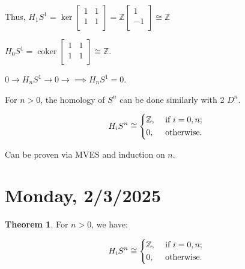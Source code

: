 \documentclass{article}
\theoremstyle{definition}
\newtheorem{theorem}{Theorem}
\begin{document}
    Thus, \(H_1 S^1 = \ker \begin{bmatrix}
        1 & 1 \\
        1 & 1 \\
    \end{bmatrix} = \mathbb{Z} \begin{bmatrix}
        1 \\
        -1 \\
    \end{bmatrix} \cong \mathbb{Z}\) 

    \(H_0 S^1 = \operatorname{coker} \begin{bmatrix}
        1 & 1 \\
        1 & 1 \\
    \end{bmatrix} \cong \mathbb{Z}\).
    
    \(0 \to H_n S^1 \to 0 \to  \implies H_n S^1 = 0\).

    For \(n > 0\), the homology of \(S^n\) can be done similarly with 2 \(D^n\).

    \[
        H_i S^n \cong \begin{dcases}
            \mathbb{Z}, &\text{ if } i=0,n ;\\
            0, &\text{ otherwise} .
        \end{dcases}
    \]

    Can be proven via MVES and induction on \(n\).

    \section*{Monday, 2/3/2025}
    
    \begin{theorem}
        For \(n > 0\), we have:

        \[
            H_i S^n \cong \begin{dcases}
                \mathbb{Z}, &\text{ if } i = 0,n ;\\
                0, &\text{ otherwise} .
            \end{dcases}
        \]
    \end{theorem}
\end{document}
